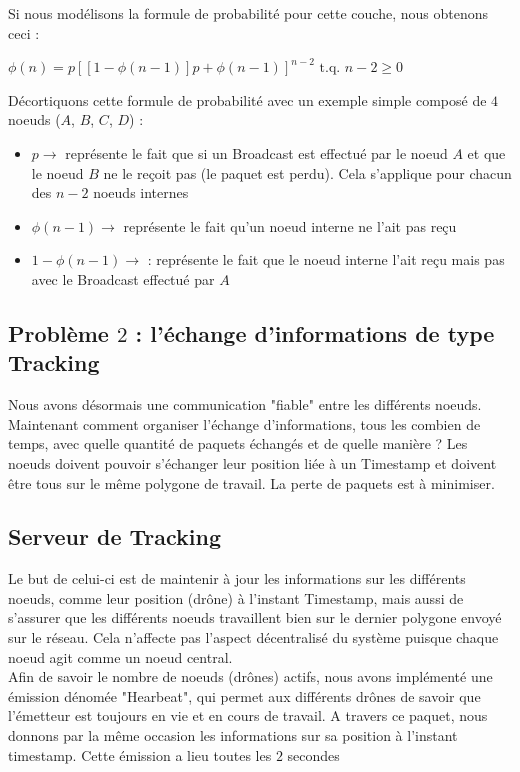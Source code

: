 \documentclass[journal, a4paper]{IEEEtran}
\begin{document}
        Si nous modélisons la formule de probabilité pour cette couche, nous obtenons ceci : 
        
        $
        \phi (n) = p[[1 - \phi (n - 1)] p + \phi (n - 1)]^{n - 2} \text{ t.q. } n - 2 \geq 0
        $

        Décortiquons cette formule de probabilité avec un exemple simple composé de $4$ noeuds ($A$, $B$, $C$, $D$) :
        \begin{itemize}
                \item $p \rightarrow$ représente le fait que si un Broadcast est effectué par le noeud $A$ et que le noeud $B$ ne le reçoit pas (le paquet est perdu). Cela s'applique pour chacun des $n-2$ noeuds internes
                \item $\phi (n - 1) \rightarrow$ représente le fait qu'un noeud interne ne l'ait pas reçu
                \item $1 - \phi (n - 1) \rightarrow$ : représente le fait que le noeud interne l'ait reçu mais pas avec le Broadcast effectué par $A$
        \end{itemize}


\subsection{Problème $2$ : l'échange d'informations de type Tracking}
        Nous avons désormais une communication "fiable" entre les différents noeuds. Maintenant comment organiser l'échange d'informations, tous les combien de temps, avec quelle quantité de 
        paquets échangés et de quelle manière ? Les noeuds doivent pouvoir s'échanger leur position liée à un Timestamp et doivent être tous sur le même polygone de travail. 
        La perte de paquets est à minimiser.

\subsection{Serveur de Tracking}
        Le but de celui-ci est de maintenir à jour les informations sur les différents noeuds, comme leur position (drône) à l'instant Timestamp, mais aussi de s'assurer 
        que les différents noeuds travaillent bien sur le dernier polygone envoyé sur le réseau. Cela n'affecte pas l'aspect décentralisé du système puisque chaque noeud agit comme un noeud central. \\ 

        Afin de savoir le nombre de noeuds (drônes) actifs, nous avons implémenté une émission dénomée "Hearbeat", qui permet aux différents drônes de savoir que l'émetteur est toujours en vie et 
        en cours de travail. A travers ce paquet, nous donnons par la même occasion les informations sur sa position à l'instant timestamp. Cette émission a lieu toutes les $2$ secondes \\
        
\end{document}
